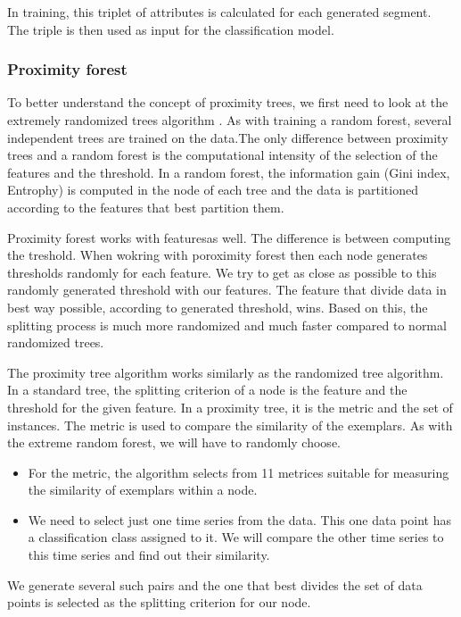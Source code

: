 \documentclass[thesis=M,english]{FITthesis}[2019/12/23]
\begin{document}
In training, this triplet of attributes is calculated for each generated segment. The triple is then used as input for the classification model.

\subsubsection{Proximity forest}
To better understand the concept of \cite{proximity_forest} proximity trees, we first need to look at the extremely randomized trees algorithm \cite{extreme_random_forest}.
As with training a random forest, several independent trees are trained on the data.The only difference between proximity trees and a random forest is the computational intensity of the selection of the features and the threshold. In a random forest, the information gain (Gini index, Entrophy) is computed in the node of each tree and the data is partitioned according to the features that best partition them.

Proximity forest works with featuresas well. The difference is between computing the treshold. When wokring with poroximity forest then each node generates thresholds randomly for each feature. We try to get as close as possible to this randomly generated threshold with our features. The feature that divide data in best way possible, according to generated threshold, wins. Based on this, the splitting process is much more randomized and much faster compared to normal randomized trees.


The proximity tree algorithm works similarly as the randomized tree algorithm. In a standard tree, the splitting criterion of a node is the feature and the threshold for the given feature. In a proximity tree, it is the metric and the set of instances. The metric is used to compare the similarity of the exemplars. 
As with the extreme random forest, we will have to randomly choose.

\begin{itemize}
		\item For the metric, the algorithm selects from 11 metrices suitable for measuring the similarity of exemplars within a node.
		\item We need to select just one time series from the data. This one data point has a classification class assigned to it. We will compare the other time series to this time series and find out their similarity.
	\end{itemize}

We generate several such pairs and the one that best divides the set of data points is selected as the splitting criterion for our node.
\end{document}

